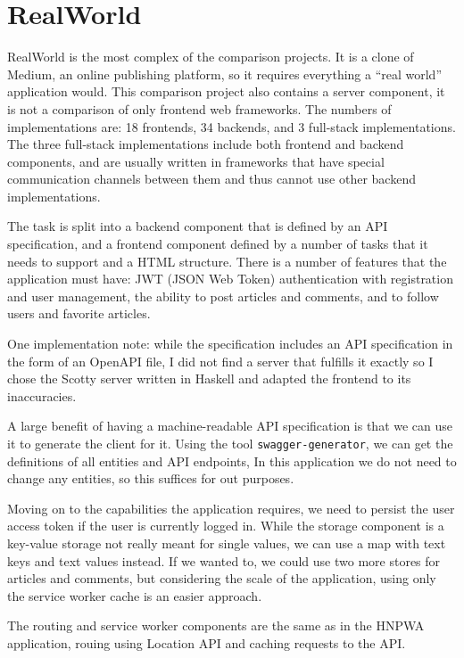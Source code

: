 \documentclass[english,odsaz]{fitthesis}
\begin{document}
\section{RealWorld}
\label{sec:org1fbf83c}
RealWorld \cite{realworld} is the most complex of the comparison projects. It is a
clone of Medium, an online publishing platform, so it requires everything a
``real world'' application would. This comparison project also contains a server
component, it is not a comparison of only frontend web frameworks. The numbers
of implementations are: 18 frontends, 34 backends, and 3 full-stack
implementations. The three full-stack implementations include both frontend and
backend components, and are usually written in frameworks that have special
communication channels between them and thus cannot use other backend
implementations.

The task is split into a backend component that is defined by an API
specification, and a frontend component defined by a number of tasks that it
needs to support and a HTML structure. There is a number of features that the
application must have: JWT (JSON Web Token) authentication with registration and
user management, the ability to post articles and comments, and to follow users
and favorite articles.

One implementation note: while the specification includes an API specification
in the form of an OpenAPI file, I did not find a server that fulfills it exactly
so I chose the Scotty server written in Haskell and adapted the frontend to its
inaccuracies.

A large benefit of having a machine-readable API specification is that we can
use it to generate the client for it. Using the tool \texttt{swagger-generator}, we can
get the definitions of all entities and API endpoints, In this application we do
not need to change any entities, so this suffices for out purposes.

Moving on to the capabilities the application requires, we need to persist the
user access token if the user is currently logged in. While the storage
component is a key-value storage not really meant for single values, we can use
a map with text keys and text values instead. If we wanted to, we could use two
more stores for articles and comments, but considering the scale of the
application, using only the service worker cache is an easier approach.

The routing and service worker components are the same as in the HNPWA
application, rouing using Location API and caching requests to the API.
\end{document}
